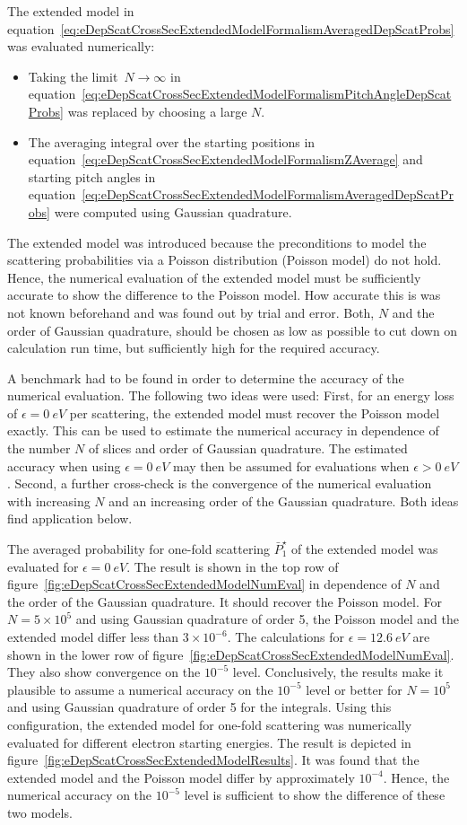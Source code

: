 The extended model in equation~\eqref{eq:eDepScatCrossSecExtendedModelFormalismAveragedDepScatProbs} was evaluated numerically:
\begin{itemize}
	\item Taking the limit~$N\rightarrow\infty$ in equation~\eqref{eq:eDepScatCrossSecExtendedModelFormalismPitchAngleDepScatProbs} was replaced by choosing a large $N$.
	\item The averaging integral over the starting positions in equation~\eqref{eq:eDepScatCrossSecExtendedModelFormalismZAverage} and starting pitch angles in equation~\eqref{eq:eDepScatCrossSecExtendedModelFormalismAveragedDepScatProbs} were computed using Gaussian quadrature. 
\end{itemize}

The extended model was introduced because the preconditions to model the scattering probabilities via a Poisson distribution (Poisson model) do not hold. Hence, the numerical evaluation of the extended model must be sufficiently accurate to show the difference to the Poisson model. How accurate this is was not known beforehand and was found out by trial and error. Both, $N$ and the order of Gaussian quadrature, should be chosen as low as possible to cut down on calculation run time, but sufficiently high for the required accuracy.

A benchmark had to be found in order to determine the accuracy of the numerical evaluation. The following two ideas were used: First, for an energy loss of $\epsilon=\SI{0}{eV}$ per scattering, the extended model must recover the Poisson model exactly. This can be used to estimate the numerical accuracy in dependence of the number $N$ of slices and order of Gaussian quadrature. The estimated accuracy when using $\epsilon=\SI{0}{eV}$ may then be assumed for evaluations when $\epsilon>\SI{0}{eV}$. Second, a further cross-check is the convergence of the numerical evaluation with increasing $N$ and an increasing order of the Gaussian quadrature. Both ideas find application below.

The averaged probability for one-fold scattering $\bar{P}^{\star}_1$ of the extended model was evaluated for $\epsilon=\SI{0}{eV}$. The result is shown in the top row of figure~\ref{fig:eDepScatCrossSecExtendedModelNumEval} in dependence of $N$ and the order of the Gaussian quadrature. It should recover the Poisson model. For $N=5\times10^5$ and using Gaussian quadrature of order 5, the Poisson model and the extended model differ less than $3\times10^{-6}$. The calculations for $\epsilon=\SI{12.6}{eV}$ are shown in the lower row of figure~\ref{fig:eDepScatCrossSecExtendedModelNumEval}. They also show convergence on the $10^{-5}$ level. Conclusively, the results make it plausible to assume a numerical accuracy on the $10^{-5}$ level or better for $N=10^5$ and using Gaussian quadrature of order 5 for the integrals. Using this configuration, the extended model for one-fold scattering was numerically evaluated for different electron starting energies. The result is depicted in figure~\ref{fig:eDepScatCrossSecExtendedModelResults}. It was found that the extended model and the Poisson model differ by approximately $10^{-4}$. Hence, the numerical accuracy on the $10^{-5}$ level is sufficient to show the difference of these two models.

